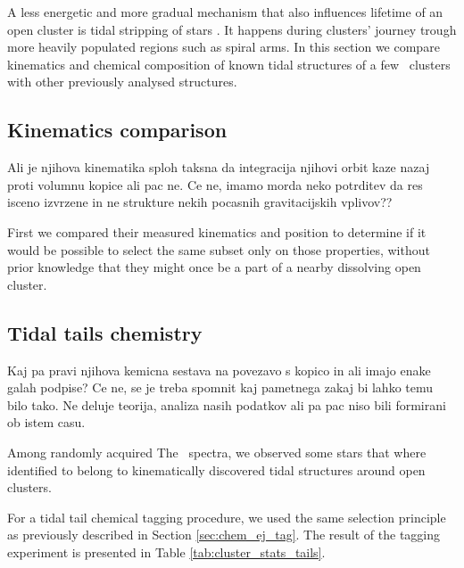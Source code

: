 A less energetic and more gradual mechanism that also influences lifetime of an open cluster is tidal stripping of stars \citep{2006A&A...455L..17L}. It happens during clusters' journey trough more heavily populated regions such as spiral arms. In this section we compare kinematics and chemical composition of known tidal structures \citep[discovered in \Gs\ data by ][]{2019AA...627A...4R, 2019AA...627A.119C, 2019AA...621L...3M, 2019arXiv191206657Z} of a few \Gh\ clusters with other previously analysed structures.

\subsection{Kinematics comparison}
Ali je njihova kinematika sploh taksna da integracija njihovi orbit kaze nazaj proti volumnu kopice ali pac ne. Ce ne, imamo morda neko potrditev da res isceno izvrzene in ne strukture nekih pocasnih gravitacijskih vplivov??

First we compared their measured kinematics and position to determine if it would be possible to select the same subset only on those properties, without prior knowledge that they might once be a part of a nearby dissolving open cluster. 

\subsection{Tidal tails chemistry}
Kaj pa pravi njihova kemicna sestava na povezavo s kopico in ali imajo enake galah podpise? Ce ne, se je treba spomnit kaj pametnega zakaj bi lahko temu bilo tako. Ne deluje teorija, analiza nasih podatkov ali pa pac niso bili formirani ob istem casu.

Among randomly acquired The \Gh\ spectra, we observed some stars that where identified to belong to kinematically discovered tidal structures around open clusters.

For a tidal tail chemical tagging procedure, we used the same selection principle as previously described in Section \ref{sec:chem_ej_tag}. The result of the tagging experiment is presented in Table \ref{tab:cluster_stats_tails}.

